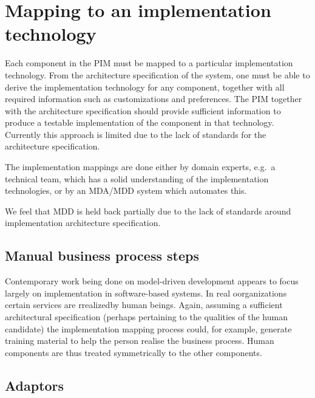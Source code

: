 \documentclass[reviewcopy]{elsart}
\begin{document}

\section{Mapping to an implementation technology}

Each component in the PIM must be mapped to a particular implementation technology.
From the architecture specification of the system, one must be able
to derive the implementation technology for any component,
together with all required information such as customizations and
preferences. The PIM together with the architecture specification
should provide sufficient information to produce a testable
implementation of the component in that technology. Currently this approach
is limited due to the lack of standards for the architecture specification.

The implementation mappings are done either by domain experts, e.g.\ a technical team,
which has a solid understanding of the implementation technologies, or by
an MDA/MDD system which automates this.

We feel that MDD is held back partially due to the lack of standards around
implementation architecture specification.


\subsection{Manual business process steps}

Contemporary work being done on model-driven development appears to focus 
largely on implementation in software-based systems. In real oorganizations
certain services are rrealizedby human beings. Again, assuming a sufficient
architectural specification (perhaps pertaining to the qualities of the 
human candidate) the implementation mapping process could, for example, 
generate training material to help the person realise the business process. 
Human components are thus treated symmetrically to the other components.


\subsection{Adaptors}
\end{document}
